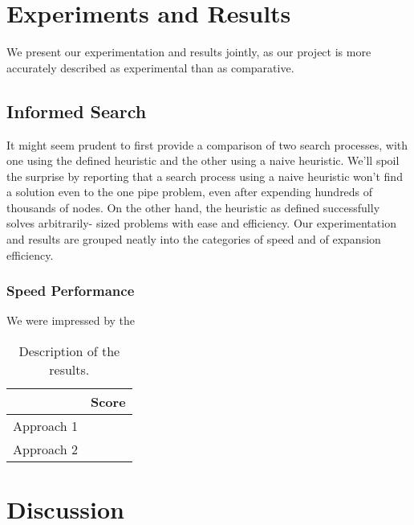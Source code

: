 \documentclass[11pt]{article}
\begin{document}
\section{Experiments and Results}
We present our experimentation and results jointly, as our project is more accurately
described as experimental than as comparative.

\subsection{Informed Search}
It might seem prudent to first provide a comparison of two search processes,
with one using the defined heuristic and the other using a naive heuristic. We'll
spoil the surprise by reporting that a search process using a naive heuristic won't
find a solution even to the one pipe problem, even after expending hundreds of thousands
of nodes. On the other hand, the heuristic as defined successfully solves arbitrarily-
sized problems with ease and efficiency. Our experimentation and results are grouped
neatly into the categories of speed and of expansion efficiency.

\subsubsection{Speed Performance}
We were impressed by the



\begin{table}
  \centering
  \begin{tabular}{ll}
    \toprule
    & Score \\
    \midrule
    Approach 1 & \\
    Approach 2 & \\
    \bottomrule
  \end{tabular}
  \caption{Description of the results.}
\end{table}


\section{Discussion}
\end{document}
